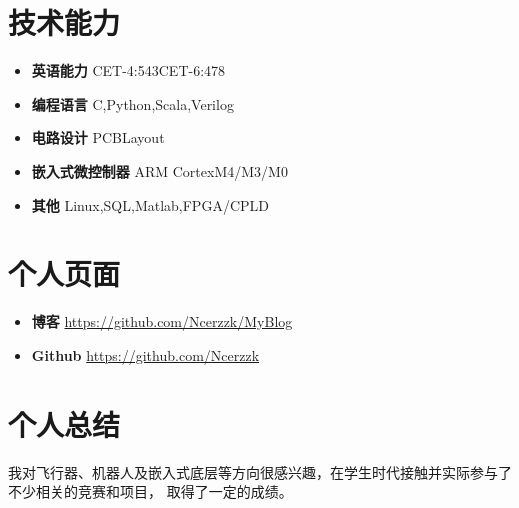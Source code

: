 \documentclass{resume}
\begin{document}




\section{技术能力}
\begin{itemize}[parsep=0.2ex]
  \item \textbf{英语能力} CET-4:543CET-6:478 
  \item \textbf{编程语言} C,Python,Scala,Verilog 
  \item \textbf{电路设计} PCBLayout
  \item \textbf{嵌入式微控制器} ARM CortexM4/M3/M0
  \item \textbf{其他} Linux,SQL,Matlab,FPGA/CPLD
  
 
\end{itemize}

\section{个人页面}
\begin{itemize}[parsep=0.2ex]
  \item \textbf{博客} \url{https://github.com/Ncerzzk/MyBlog}
  \item \textbf{Github} \url{https://github.com/Ncerzzk}
\end{itemize}

\section{个人总结}
我对飞行器、机器人及嵌入式底层等方向很感兴趣，在学生时代接触并实际参与了不少相关的竞赛和项目， 取得了一定的成绩。


%
%
\end{document}

